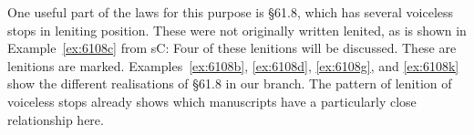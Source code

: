 One useful part of the laws for this purpose is \S 61.8, which has several voiceless stops in leniting position. These were not originally written lenited, as is shown in Example~\ref{ex:6108c} from \gls{sC}:
Four of these lenitions will be discussed. These are lenitions are marked. Examples~\ref{ex:6108b}, \ref{ex:6108d}, \ref{ex:6108g}, and \ref{ex:6108k} show the different realisations of \S 61.8 in our branch. The pattern of lenition of voiceless stops already shows which manuscripts have a particularly close relationship here. 
